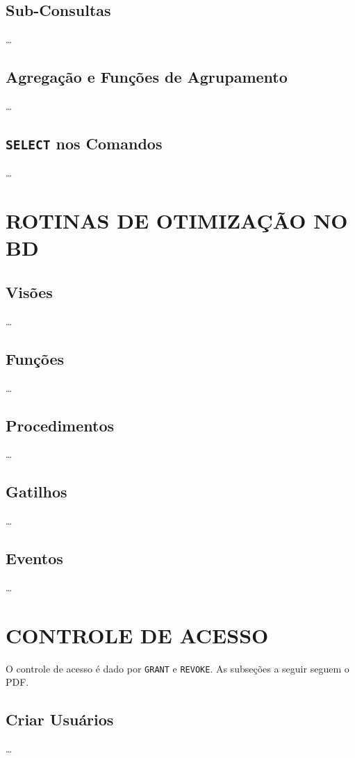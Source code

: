 \documentclass[
12pt,
a4paper,
semrecuonosumario,
sumario = abnt-6027-2012]{report}
\begin{document}
    \section{Sub-Consultas}
    \dots
    
    \section{Agregação e Funções de Agrupamento}
    \dots
    
    \section{\texttt{SELECT} nos Comandos}
    \dots

\chapter{ROTINAS DE OTIMIZAÇÃO NO BD}\label{chap:otimizacao}
    \section{Visões}
    \dots
    
    \section{Funções}
    \dots
    
    \section{Procedimentos}
    \dots
    
    \section{Gatilhos}
    \dots
    
    \section{Eventos}
    \dots

\chapter{CONTROLE DE ACESSO}\label{chap:acesso}
O controle de acesso é dado por \texttt{GRANT} e \texttt{REVOKE}. As subseções a seguir seguem o PDF.
    
    \section{Criar Usuários}
    \dots
    
\end{document}
